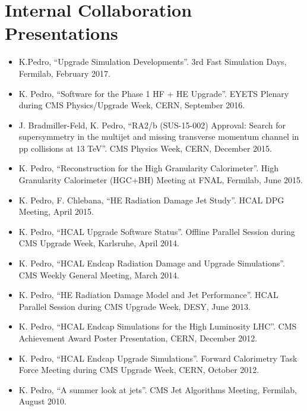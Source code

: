 \ifdefined\longestflag
\section{Internal Collaboration Presentations}
\begin{itemize}[leftmargin=12pt]
\item K.Pedro, ``Upgrade Simulation Developments''. 3rd Fast Simulation Days, Fermilab, February 2017.
\item K. Pedro, ``Software for the Phase 1 HF + HE Upgrade''. EYETS Plenary during CMS Physics/Upgrade Week, CERN, September 2016.
\item J. Bradmiller-Feld, K. Pedro, ``RA2/b (SUS-15-002) Approval: Search for supersymmetry in the multijet and missing transverse momentum channel in pp collisions at 13 TeV''. CMS Physics Week, CERN, December 2015.
\item K. Pedro, ``Reconstruction for the High Granularity Calorimeter''. High Granularity Calorimeter (HGC+BH) Meeting at FNAL, Fermilab, June 2015.
\item K. Pedro, F. Chlebana, ``HE Radiation Damage Jet Study''. HCAL DPG Meeting, April 2015.
\item K. Pedro, ``HCAL Upgrade Software Status''. Offline Parallel Session during CMS Upgrade Week, Karlsruhe, April 2014.
\item K. Pedro, ``HCAL Endcap Radiation Damage and Upgrade Simulations''. CMS Weekly General Meeting, March 2014.
\item K. Pedro, ``HE Radiation Damage Model and Jet Performance''. HCAL Parallel Session during CMS Upgrade Week, DESY, June 2013.
\item K. Pedro, ``HCAL Endcap Simulations for the High Luminosity LHC''. CMS Achievement Award Poster Presentation, CERN, December 2012.
\item K. Pedro, ``HCAL Endcap Upgrade Simulations''. Forward Calorimetry Task Force Meeting during CMS Upgrade Week, CERN, October 2012.
\item K. Pedro, ``A summer look at jets''. CMS Jet Algorithms Meeting, Fermilab, August 2010.
\end{itemize}
\fi